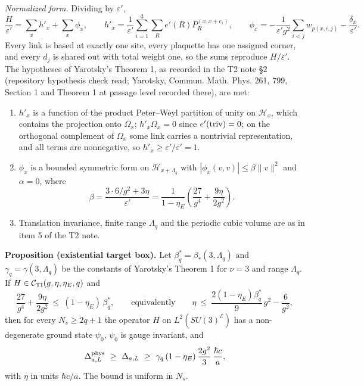 \documentclass[11pt,a4paper]{article}
\newcommand{\tightlist}{\setlength{\itemsep}{0pt}\setlength{\parskip}{0pt}}
\begin{document}
\emph{Normalized form.} Dividing by \(\varepsilon'\),
\[\frac H{\varepsilon'}=\sum_xh'_x+\sum_x\phi_x,\qquad
h'_x=\frac1{\varepsilon'}\sum_{i=1}^3\sum_Re'(R)P_R^{(x,x+e_i)},\qquad
\phi_x=-\frac1{\varepsilon'g^2}\sum_{i<j}w_{p(x,i,j)}-\frac{\delta_x}{\varepsilon'} .\]
Every link is based at exactly one site, every plaquette has one
assigned corner, and every \(d_j\) is shared out with total weight one,
so the sums reproduce \(H/\varepsilon'\). The hypotheses of Yarotsky's
Theorem 1, as recorded in the T2 note §2 (repository hypothesis check
read; Yarotsky, Commun. Math. Phys. 261, 799, Section 1 and Theorem 1 at
passage level recorded there), are met:

\begin{enumerate}
\def\labelenumi{\arabic{enumi}.}
\tightlist
\item
  \(h'_x\) is a function of the product Peter--Weyl partition of unity
  on \(\mathcal H_x\), which contains the projection onto \(\Omega_x\);
  \(h'_x\Omega_x=0\) since \(e'({\rm triv})=0\); on the orthogonal
  complement of \(\Omega_x\) some link carries a nontrivial
  representation, and all terms are nonnegative, so
  \(h'_x\ge\varepsilon'/\varepsilon'=1\).
\item
  \(\phi_x\) is a bounded symmetric form on \(\mathcal H_{x+\Lambda_q}\)
  with \(|\phi_x(v,v)|\le\beta\|v\|^2\) and \(\alpha=0\), where
  \[\beta=\frac{3\cdot6/g^2+3\eta}{\varepsilon'}
  =\frac1{1-\eta_E}\left(\frac{27}{g^4}+\frac{9\eta}{2g^2}\right).\]
\item
  Translation invariance, finite range \(\Lambda_q\) and the periodic
  cubic volume are as in item 5 of the T2 note.
\end{enumerate}

\textbf{Proposition (existential target box).} Let
\(\beta^*_q=\beta_*(3,\Lambda_q)\) and \(\gamma_q=\gamma(3,\Lambda_q)\)
be the constants of Yarotsky's Theorem 1 for \(\nu=3\) and range
\(\Lambda_q\). If \(H\in\mathcal C_{\rm TI}(g,\eta,\eta_E,q)\) and
\[\frac{27}{g^4}+\frac{9\eta}{2g^2}\ \le\ (1-\eta_E)\,\beta^*_q,
\qquad\text{equivalently}\qquad
\eta\ \le\ \frac{2(1-\eta_E)\beta^*_q}9\,g^2-\frac6{g^2},\] then for
every \(N_s\ge2q+1\) the operator \(H\) on \(L^2(SU(3)^{\mathcal E})\)
has a non-degenerate ground state \(\psi_0\), \(\psi_0\) is gauge
invariant, and
\[\Delta^{\rm phys}_{a,L}\ \ge\ \Delta_{a,L}\ \ge\ \gamma_q\,(1-\eta_E)\,\frac{2g^2}3\,\frac{\hbar c}a,\]
with \(\eta\) in units \(\hbar c/a\). The bound is uniform in \(N_s\).
\end{document}
